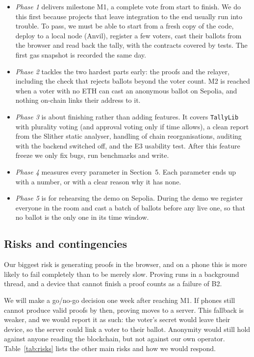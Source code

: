 \begin{itemize}
  \item \emph{Phase 1} delivers milestone M1, a complete vote from start to
        finish. We do this first because projects that leave integration to
        the end usually run into trouble. To pass, we must be able to start
        from a fresh copy of the code, deploy to a local node (Anvil), register
        a few voters, cast their ballots from the browser and read back the
        tally, with the contracts covered by tests. The first gas snapshot is
        recorded the same day.
  \item \emph{Phase 2} tackles the two hardest parts early: the proofs and the
        relayer, including the check that rejects ballots beyond the voter
        count. M2 is reached when a voter with no ETH can cast an anonymous
        ballot on Sepolia, and nothing on-chain links their address to it.
  \item \emph{Phase 3} is about finishing rather than adding features. It
        covers \texttt{TallyLib} with plurality voting (and approval voting
        only if time allows), a clean report from the Slither static analyser,
        handling of chain reorganisations, auditing with the backend switched
        off, and the E3 usability test. After this feature freeze we only fix
        bugs, run benchmarks and write.
  \item \emph{Phase 4} measures every parameter in Section~5. Each parameter
        ends up with a number, or with a clear reason why it has none.
  \item \emph{Phase 5} is for rehearsing the demo on Sepolia. During the demo
        we register everyone in the room and cast a batch of ballots before any
        live one, so that no ballot is the only one in its time window.
\end{itemize}

\subsection{Risks and contingencies}

Our biggest risk is generating proofs in the browser, and on a phone this is
more likely to fail completely than to be merely slow. Proving runs in a
background thread, and a device that cannot finish a proof counts as a failure
of B2.

We will make a go/no-go decision one week after reaching M1. If phones still
cannot produce valid proofs by then, proving moves to a server. This fallback
is weaker, and we would report it as such: the voter's secret would leave their
device, so the server could link a voter to their ballot. Anonymity would still
hold against anyone reading the blockchain, but not against our own operator.
Table~\ref{tab:risks} lists the other main risks and how we would respond.

